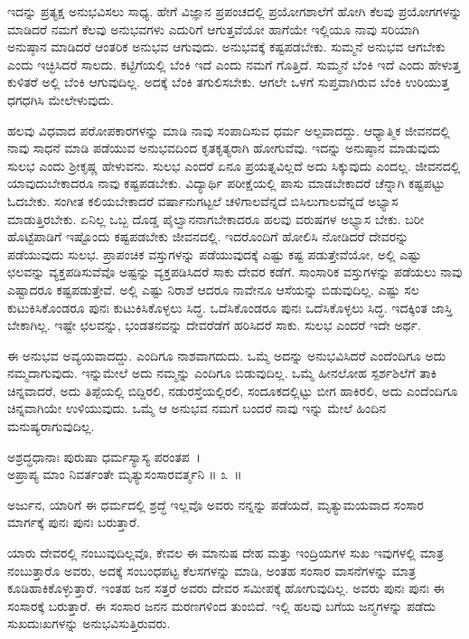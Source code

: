 ಇದನ್ನು ಪ್ರತ್ಯಕ್ಷ ಅನುಭವಿಸಲು ಸಾಧ್ಯ. ಹೇಗೆ ವಿಜ್ಞಾನ ಪ್ರಪಂಚದಲ್ಲಿ ಪ್ರಯೋಗಶಾಲೆಗೆ ಹೋಗಿ ಕೆಲವು ಪ್ರಯೋಗಗಳನ್ನು ಮಾಡಿದರೆ ನಮಗೆ ಕೆಲವು ಅನುಭವಗಳು ಎದುರಿಗೆ ಆಗು\-ತ್ತವೆಯೋ ಹಾಗೆಯೇ ಇಲ್ಲಿಯೂ ನಾವು ಸರಿಯಾಗಿ ಅನುಷ್ಠಾನ ಮಾಡಿದರೆ ಆಂತರಿಕ ಅನುಭವ ಆಗುವುದು. ಅನುಭವಕ್ಕೆ ಕಷ್ಟಪಡಬೇಕು. ಸುಮ್ಮನೆ ಅನುಭವ ಆಗಬೇಕು ಎಂದು ಇಚ್ಛಿಸಿದರೆ ಸಾಲದು. ಕಟ್ಟಿಗೆಯಲ್ಲಿ ಬೆಂಕಿ ಇದೆ ಎಂದು ನಮಗೆ ಗೊತ್ತಿದೆ. ಸುಮ್ಮನೆ ಬೆಂಕಿ ಇದೆ ಎಂದು ಹೇಳುತ್ತ ಕುಳಿತರೆ ಅಲ್ಲಿ ಬೆಂಕಿ ಆಗುವುದಿಲ್ಲ. ಅದಕ್ಕೆ ಬೆಂಕಿ ತಗುಲಿಸಬೇಕು. ಆಗಲೇ ಒಳಗೆ ಸುಪ್ತವಾಗಿರುವ ಬೆಂಕಿ ಉರಿಯುತ್ತ ಧಗಧಗಿಸಿ ಮೇಲೇಳುವುದು.

ಹಲವು ವಿಧವಾದ ಪರೋಪಕಾರಗಳನ್ನು ಮಾಡಿ ನಾವು ಸಂಪಾದಿಸುವ ಧರ್ಮ ಅಲ್ಪವಾದದ್ದು. ಆಧ್ಯಾತ್ಮಿಕ ಜೀವನದಲ್ಲಿ ನಾವು ಸಾಧನೆ ಮಾಡಿ ಪಡೆಯುವ ಅನುಭವದಿಂದ ಕೃತಕೃತ್ಯರಾಗಿ ಹೋಗುವೆವು. ಇದನ್ನು ಅನುಷ್ಠಾನ ಮಾಡುವುದು ಸುಲಭ ಎಂದು ಶ‍್ರೀಕೃಷ್ಣ ಹೇಳುವನು. ಸುಲಭ ಎಂದರೆ ಏನೂ ಪ್ರಯತ್ನವಿಲ್ಲದೆ ಅದು ಸಿಕ್ಕುವುದು ಎಂದಲ್ಲ. ಜೀವನದಲ್ಲಿ ಯಾವುದು\break ಬೇಕಾದರೂ ನಾವು ಕಷ್ಟಪಡಬೇಕು. ವಿದ್ಯಾರ್ಥಿ ಪರೀಕ್ಷೆಯಲ್ಲಿ ಪಾಸು ಮಾಡಬೇಕಾದರೆ ಚೆನ್ನಾಗಿ ಕಷ್ಟಪಟ್ಟು ಓದಬೇಕು. ಸಂಗೀತ ಕಲಿಯಬೇಕಾದರೆ ವರ್ಷಾನುಗಟ್ಟಲೆ ಚಳಿಗಾಲ\-ವೆನ್ನದೆ ಬಿಸಿಲು\-ಗಾಲ\-ವೆನ್ನದೆ ಅಭ್ಯಾಸ ಮಾಡುತ್ತಿರಬೇಕು. ಏನಿಲ್ಲ ಒಬ್ಬ ದೊಡ್ಡ ಪೈಲ್ವಾನನಾಗಬೇಕಾದರೂ ಹಲವು ವರುಷಗಳ ಅಭ್ಯಾಸ ಬೇಕು. ಬರೀ ಹೊಟ್ಟೆಪಾಡಿಗೆ ಇಷ್ಟೊಂದು ಕಷ್ಟಪಡಬೇಕು ಜೀವನದಲ್ಲಿ. ಇದರೊಂದಿಗೆ ಹೋಲಿಸಿ ನೋಡಿದರೆ ದೇವರನ್ನು ಪಡೆಯುವುದು ಸುಲಭ. ಪ್ರಾಪಂಚಿಕ ವಸ್ತುಗಳನ್ನು ಪಡೆಯುವುದಕ್ಕೆ ಎಷ್ಟು ಕಷ್ಟ ಪಡುತ್ತೇವೆಯೋ, ಅಲ್ಲಿ ಎಷ್ಟು ಛಲವನ್ನು ವ್ಯಕ್ತಪಡಿಸುವೆವೊ ಅಷ್ಟನ್ನು ವ್ಯಕ್ತಪಡಿಸಿದರೆ ಸಾಕು ದೇವರ ಕಡೆಗೆ. ಸಾಂಸಾರಿಕ ವಸ್ತುಗಳನ್ನು ಪಡೆಯಲು ನಾವು ಎಷ್ಟಾದರೂ ಕಷ್ಟಪಡುತ್ತೇವೆ. ಅಲ್ಲಿ ಎಷ್ಟು ನಿರಾಶೆ ಆದರೂ ನಾವೇನೂ ಆಸೆಯನ್ನು ಬಿಡುವುದಿಲ್ಲ. ಎಷ್ಟು ಸಲ ಕುಟುಕಿಸಿಕೊಂಡರೂ ಪುನಃ ಕುಟುಕಿಸಿಕೊಳ್ಳಲು ಸಿದ್ಧ. ಒದೆಸಿಕೊಂಡರೂ ಪುನಃ ಒದೆಸಿಕೊಳ್ಳಲು ಸಿದ್ಧ. ಇದಕ್ಕಿಂತ ಜಾಸ್ತಿ ಬೇಕಾಗಿಲ್ಲ. ಇಷ್ಟೇ ಛಲವನ್ನು, ಭಂಡತನವನ್ನು ದೇವರೆಡೆಗೆ ಹರಿಸಿದರೆ ಸಾಕು. ಸುಲಭ ಎಂದರೆ ಇದೇ ಅರ್ಥ.

ಈ ಅನುಭವ ಅವ್ಯಯವಾದದ್ದು. ಎಂದಿಗೂ ನಾಶವಾಗದುದು. ಒಮ್ಮೆ ಅದನ್ನು ಅನುಭವಿಸಿದರೆ ಎಂದೆಂದಿಗೂ ಅದು ನಮ್ಮದಾಗುವುದು. ಇನ್ನುಮೇಲೆ ಅದು ನಮ್ಮನ್ನು ಎಂದಿಗೂ ಬಿಡುವುದಿಲ್ಲ. ಒಮ್ಮೆ ಹೀನಲೋಹ ಸ್ಪರ್ಶಶಿಲೆಗೆ ತಾಕಿ ಚಿನ್ನವಾದರೆ, ಅದು ತಿಪ್ಪೆಯಲ್ಲಿ ಬಿದ್ದಿರಲಿ, ನಡುರಸ್ತೆಯಲ್ಲಿರಲಿ, ಸಂದೂಕದಲ್ಲಿಟ್ಟು ಬೀಗ ಹಾಕಿರಲಿ, ಅದು ಎಂದೆಂದಿಗೂ ಚಿನ್ನವಾಗಿಯೇ ಉಳಿಯುವುದು. ಒಮ್ಮೆ ಆ ಅನುಭವ ನಮಗೆ ಬಂದರೆ ನಾವು ಇನ್ನು ಮೇಲೆ ಹಿಂದಿನ ಮನುಷ್ಯರಾಗುವುದಿಲ್ಲ.

\begin{shloka}
ಅಶ್ರದ್ಧಧಾನಾಃ ಪುರುಷಾ ಧರ್ಮಸ್ಯಾಸ್ಯ ಪರಂತಪ~।\\ಅಪ್ರಾಪ್ಯ ಮಾಂ ನಿವರ್ತಂತೇ ಮೃತ್ಯುಸಂಸಾರವರ್ತ್ಮನಿ \hfill॥ ೩~॥
\end{shloka}

\begin{artha}
ಅರ್ಜುನ, ಯಾರಿಗೆ ಈ ಧರ್ಮದಲ್ಲಿ ಶ್ರದ್ಧೆ ಇಲ್ಲವೊ ಅವರು ನನ್ನನ್ನು ಪಡೆಯದೆ, ಮೃತ್ಯುಮಯವಾದ ಸಂಸಾರ ಮಾರ್ಗಕ್ಕೆ ಪುನಃ ಪುನಃ ಬರುತ್ತಾರೆ.
\end{artha}

ಯಾರು ದೇವರಲ್ಲಿ ನಂಬುವುದಿಲ್ಲವೊ, ಕೇವಲ ಈ ಮಾನುಷ ದೇಹ ಮತ್ತು ಇಂದ್ರಿಯಗಳ ಸುಖ ಇವುಗಳಲ್ಲಿ ಮಾತ್ರ ನಂಬುತ್ತಾರೊ ಅವರು, ಅದಕ್ಕೆ ಸಂಬಂಧಪಟ್ಟ ಕೆಲಸಗಳನ್ನು ಮಾಡಿ, ಅಂತಹ ಸಂಸಾರ ವಾಸನೆಗಳನ್ನು ಮಾತ್ರ ಕೂಡಿಹಾಕಿಕೊಳ್ಳುತ್ತಾರೆ. ಇಂತಹ ಜನ ಸತ್ತರೆ ಅವರು ದೇವರ ಸಮೀಪಕ್ಕೆ ಹೋಗುವುದಿಲ್ಲ. ಅವರು ಪುನಃ ಪುನಃ ಈ ಸಂಸಾರಕ್ಕೆ ಬರುತ್ತಾರೆ. ಈ ಸಂಸಾರ ಜನನ ಮರಣಗಳಿಂದ ತುಂಬಿದೆ. ಇಲ್ಲಿ ಹಲವು ಬಗೆಯ ಜನ್ಮಗಳನ್ನು ಪಡೆದು ಸುಖದುಃಖಗಳನ್ನು ಅನುಭವಿಸುತ್ತಿರುವರು.

